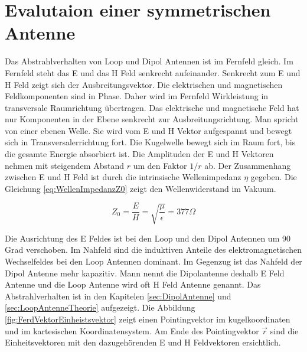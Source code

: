 \newpage
\section{Evalutaion einer symmetrischen Antenne}
Das Abstrahlverhalten von Loop und Dipol Antennen ist im Fernfeld gleich. Im Fernfeld steht das E und das
H Feld senkrecht aufeinander. Senkrecht zum E und H Feld zeigt sich der Ausbreitungsvektor. Die elektrischen und
magnetischen Feldkomponenten sind in Phase. Daher wird im Fernfeld Wirkleistung in transversale Raumrichtung
übertragen. Das elektrische und magnetische Feld hat nur Komponenten in der Ebene senkrecht zur Ausbreitungsrichtung.
Man spricht von einer ebenen Welle. Sie wird vom E und H Vektor aufgespannt  und bewegt sich in
Transversalerrichtung fort. Die Kugelwelle bewegt sich im Raum fort, bis die gesamte Energie absorbiert ist. Die Amplituden der E und H Vektoren
nehmen mit steigendem Abstand $r$ um den Faktor $1/r$  ab. Der Zusammenhang zwischen E und H Feld ist
durch die intrinsische Wellenimpedanz $\eta$ gegeben. 
Die Gleichung \ref{eq:WellenImpedanzZ0} zeigt den Wellenwiderstand im Vakuum.

\begin{equation}\label{eq:WellenImpedanzZ0}
Z_{0}=\dfrac{E}{H}=\sqrt{\dfrac{\mu}{\epsilon}}=377\Omega
\end{equation}

\cite{rothammel1991antennenbuch}
\cite{elliott1981antenna}
\cite{Harrington-TimeHarmonic}
\cite{Emant}

Die Ausrichtung des E Feldes ist bei den Loop und den Dipol Antennen um 90 Grad verschoben. 
Im Nahfeld sind die induktiven Anteile des elektromagnetischen Wechselfeldes bei den Loop Antennen dominant. 
Im Gegenzug ist das Nahfeld der Dipol Antenne mehr kapazitiv.
Mann nennt die Dipolantenne deshalb E Feld Antenne und die Loop Antenne wird oft H Feld Antenne genannt.
Das Abstrahlverhalten ist in den Kapitelen \ref{sec:DipolAntenne} und \ref{sec:LoopAntenneTheorie} aufgezeigt. Die Abbildung \ref{fig:FerdVektorEinheistsvektor} zeigt einen Pointingvektor im  kugelkoordinaten und im kartesischen Koordinatensystem. Am Ende des Pointingvektor $\vec{r}$  sind die Einheitsvektoren mit den dazugehörenden  E und H Feldvektoren ersichtlich.\\



